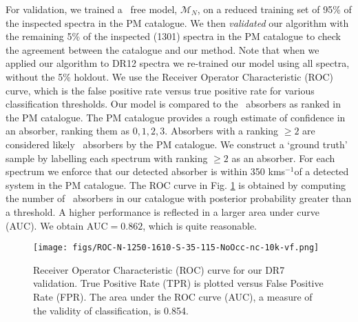 \documentclass[fleqn,usenatbib]{mnras}
\newcommand{\civ}{\ion{C}{IV}}
\newcommand{\kms}{kms$^{-1}$} %
\newcommand{\model}{\mathcal{M}}
\begin{document}
For validation, we trained a \civ\ free model, $\model_{N}$, on a reduced training set of 95\% of the
inspected spectra in the PM catalogue.
We then \emph{validated} our algorithm with the remaining 5\% of the
inspected (1301) spectra in the PM catalogue to
check the agreement between the catalogue and our method.
Note that when we applied our algorithm to DR12 spectra we re-trained our model
using all spectra, without the 5\% holdout.
We use the Receiver Operator Characteristic (ROC) curve, which is
 the false positive rate versus true positive rate
 for various classification thresholds.
Our model is compared to the \civ~absorbers as ranked in the PM catalogue. The PM catalogue provides a rough estimate of confidence in an absorber, ranking them as $0,1,2,3$. Absorbers with a ranking $\ge 2$ are considered likely \civ~absorbers by the PM catalogue.
We construct a `ground truth' sample by labelling each spectrum with ranking $\ge2$ as an absorber. For each spectrum we enforce that our detected absorber is within 350 \kms of a detected system in the PM catalogue. The ROC curve in Fig. \ref{fig:ROC} is obtained by computing the number of \civ\ absorbers in our catalogue with posterior probability greater than a threshold.
A higher performance is reflected in a larger area under curve (\textsc{AUC}).
We obtain \textsc{AUC}$=0.862$, which is quite reasonable.

\begin{figure}
  \centering
  \texttt{[image: figs/ROC-N-1250-1610-S-35-115-NoOcc-nc-10k-vf.png]}
  \caption{Receiver Operator Characteristic (ROC) curve for our DR7 validation. True Positive Rate (TPR) is plotted versus False Positive Rate (FPR). The area under the ROC curve (AUC), a measure of the validity of classification, is 0.854.
  }
  \label{fig:ROC}
\end{figure}
\end{document}

